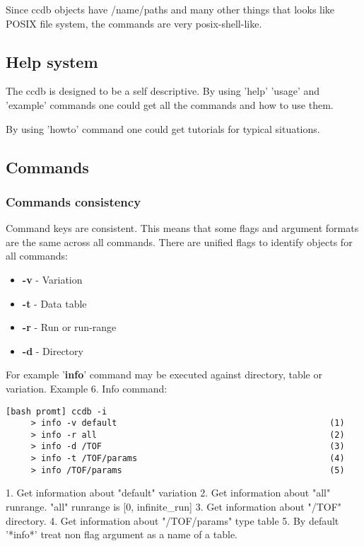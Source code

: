 \documentclass{article}
\begin{document}
Since ccdb objects have /name/paths and many other things that looks like
POSIX file system, the commands are very posix-shell-like.


\subsection{Help system}

The ccdb is designed to be a self descriptive. By using 'help' 'usage' and 'example' commands
one could get all the commands and how to use them.

By using 'howto' command one could get tutorials for typical situations.


\subsection{Commands}

\subsubsection{Commands consistency}

Command keys are consistent. This means that some flags and argument formats
are the same across all commands. There are unified flags to identify objects for all commands:
\begin{itemize}
  \item \textbf{-v} - Variation
  \item \textbf{-t} - Data table
  \item \textbf{-r} - Run or run-range
  \item \textbf{-d} - Directory
\end{itemize}

For example '\textbf{info}' command may be executed against directory, table or variation.
Example 6. Info command:
\begin{verbatim}
[bash promt] ccdb -i
     > info -v default                                          (1)
     > info -r all                                              (2)
     > info -d /TOF                                             (3)
     > info -t /TOF/params                                      (4)
     > info /TOF/params                                         (5)
\end{verbatim}

1. Get information about "default" variation
2. Get information about "all" runrange. "all" runrange is [0, infinite\_run]
3. Get information about "/TOF" directory.
4. Get information about "/TOF/params" type table
5. By default '*info*' treat non flag argument as a name of a table.
\end{document}
